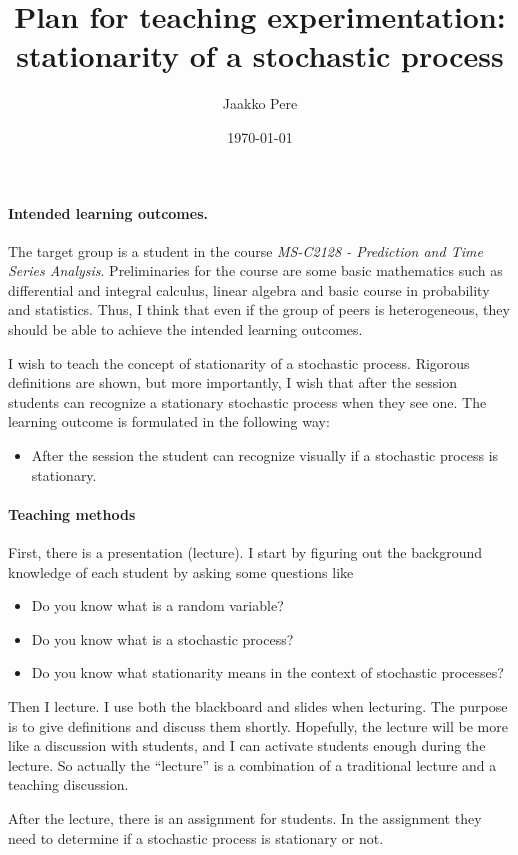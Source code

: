 \documentclass[a4paper,12pt]{article}
\title{Plan for teaching experimentation: stationarity of a stochastic process}
\author{Jaakko Pere}
\date{\today}
\begin{document}
\maketitle

\paragraph{Intended learning outcomes.} The target group is a student in the
course \emph{MS-C2128 - Prediction and Time Series Analysis}. Preliminaries for
the course are some basic mathematics such as differential and integral
calculus, linear algebra and basic course in probability and statistics. Thus, I
think that even if the group of peers is heterogeneous, they should be able to
achieve the intended learning outcomes.

I wish to teach the concept of stationarity of a stochastic process. Rigorous
definitions are shown, but more importantly, I wish that after the session
students can recognize a stationary stochastic process when they see one. The
learning outcome is formulated in the following way:
\begin{itemize}
    \item After the session the student can recognize visually if a stochastic
    process is stationary.
\end{itemize}

\paragraph{Teaching methods} First, there is a presentation (lecture). I start by
figuring out the background knowledge of each student by asking some questions
like
\begin{itemize}
    \item Do you know what is a random variable?
    \item Do you know what is a stochastic process?
    \item Do you know what stationarity means in the context of stochastic
    processes?
\end{itemize}
Then I lecture. I use both the blackboard and slides when lecturing. The purpose
is to give definitions and discuss them shortly. Hopefully, the lecture will be
more like a discussion with students, and I can activate students enough during
the lecture. So actually the ``lecture'' is a combination of a traditional
lecture and a teaching discussion.

After the lecture, there is an assignment for students. In the assignment they
need to determine if a stochastic process is stationary or not.
\end{document}
